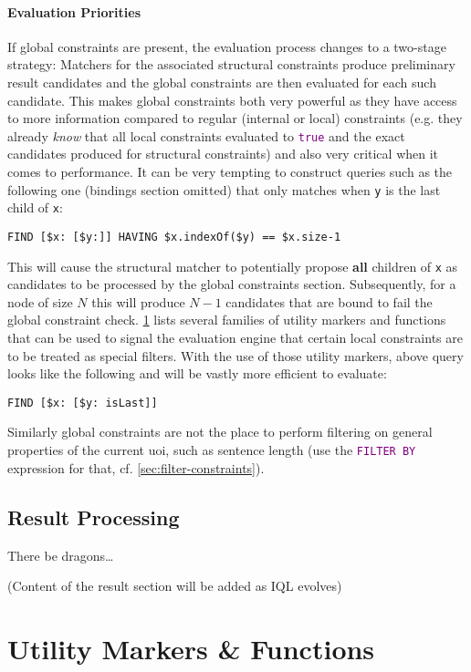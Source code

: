\documentclass[11pt,a4paper,portrait]{article}
\newcommand{\iql}{IQL\xspace}
\newcommand{\keyword}[1]{\textcolor{purple}{\texttt{#1}}}
\newcommand{\member}[1]{\texttt{#1}}
\begin{document}
\paragraph{Evaluation Priorities}
\noindent If global constraints are present, the evaluation process changes to a two-stage strategy:
Matchers for the associated structural constraints produce preliminary result candidates and the global constraints are then evaluated for each such candidate.
This makes global constraints both very powerful as they have access to more information compared to regular (internal or local) constraints (e.g. they already \textit{know} that all local constraints evaluated to \keyword{true} and the exact candidates produced for structural constraints) and also very critical when it comes to performance.
It can be very tempting to construct queries such as the following one (bindings section omitted) that only matches when \member{y} is the last child of \member{x}:
\begin{verbatim}
FIND [$x: [$y:]] HAVING $x.indexOf($y) == $x.size-1
\end{verbatim}
This will cause the structural matcher to potentially propose \textbf{all} children of \member{x} as candidates to be processed by the global constraints section.
Subsequently, for a node of size $N$ this will produce $N-1$ candidates that are bound to fail the global constraint check.
\cref{sec:utility} lists several families of utility markers and functions that can be used to signal the evaluation engine that certain local constraints are to be treated as special filters.
With the use of those utility markers, above query looks like the following and will be vastly more efficient to evaluate:
\begin{verbatim}
FIND [$x: [$y: isLast]]
\end{verbatim}
Similarly global constraints are not the place to perform filtering on general properties of the current \ac{uoi}, such as sentence length (use the \keyword{FILTER BY} expression for that, cf. \cref{sec:filter-constraints}).

\subsection{Result Processing}
\label{sec:result-processing}

There be dragons\dots

(Content of the result section will be added as \iql evolves)

\section{Utility Markers \& Functions}
\label{sec:utility}
\end{document}
